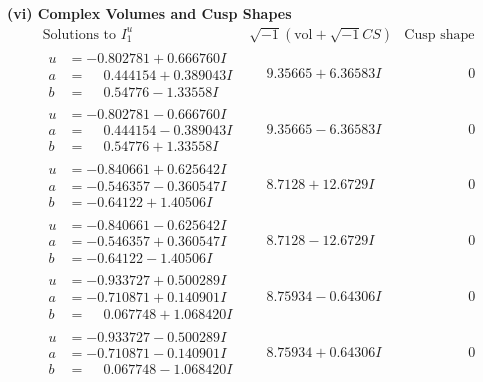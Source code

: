 \documentclass[1p]{elsarticle_modified}
\theoremstyle{definition}
\newcommand{\I}{\sqrt{-1}}
\begin{document}
\newpage\flushleft \textbf{(vi) Complex Volumes and Cusp Shapes}
$$\begin{array}{c|c|c}  
\text{Solutions to }I^u_{1}& \I (\text{vol} + \sqrt{-1}CS) & \text{Cusp shape}\\
 \hline 
\begin{aligned}
u &= -0.802781 + 0.666760 I \\
a &= \phantom{-}0.444154 + 0.389043 I \\
b &= \phantom{-}0.54776 - 1.33558 I\end{aligned}
 & \phantom{-}9.35665 + 6.36583 I & \phantom{-0.000000 } 0 \\ \hline\begin{aligned}
u &= -0.802781 - 0.666760 I \\
a &= \phantom{-}0.444154 - 0.389043 I \\
b &= \phantom{-}0.54776 + 1.33558 I\end{aligned}
 & \phantom{-}9.35665 - 6.36583 I & \phantom{-0.000000 } 0 \\ \hline\begin{aligned}
u &= -0.840661 + 0.625642 I \\
a &= -0.546357 - 0.360547 I \\
b &= -0.64122 + 1.40506 I\end{aligned}
 & \phantom{-}8.7128 + 12.6729 I & \phantom{-0.000000 } 0 \\ \hline\begin{aligned}
u &= -0.840661 - 0.625642 I \\
a &= -0.546357 + 0.360547 I \\
b &= -0.64122 - 1.40506 I\end{aligned}
 & \phantom{-}8.7128 - 12.6729 I & \phantom{-0.000000 } 0 \\ \hline\begin{aligned}
u &= -0.933727 + 0.500289 I \\
a &= -0.710871 + 0.140901 I \\
b &= \phantom{-}0.067748 + 1.068420 I\end{aligned}
 & \phantom{-}8.75934 - 0.64306 I & \phantom{-0.000000 } 0 \\ \hline\begin{aligned}
u &= -0.933727 - 0.500289 I \\
a &= -0.710871 - 0.140901 I \\
b &= \phantom{-}0.067748 - 1.068420 I\end{aligned}
 & \phantom{-}8.75934 + 0.64306 I & \phantom{-0.000000 } 0 \\ \hline\begin{aligned}

\end{aligned}
\end{array}$$
\end{document}
